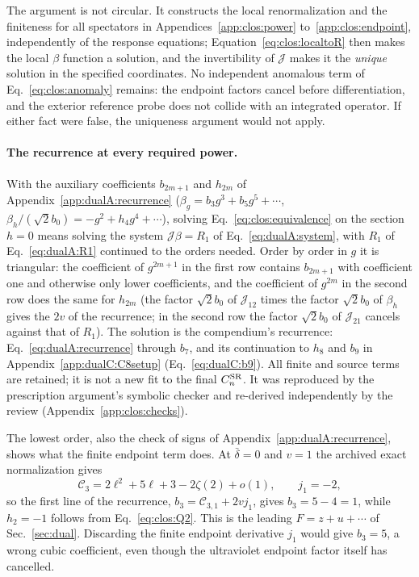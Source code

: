\documentclass[11pt,a4paper]{article}
\numberwithin{equation}{section}
\newcommand{\CSR}{C^{\rm SR}}
\newcommand{\db}{\bar\delta}
\begin{document}
The argument is not circular. It constructs the local renormalization and the finiteness for all spectators in
Appendices~\ref{app:clos:power} to~\ref{app:clos:endpoint}, independently of the response equations;
Equation~\eqref{eq:clos:localtoR} then makes the local $\beta$ function a solution, and the invertibility of
$\mathcal J$ makes it the \emph{unique} solution in the specified coordinates. No
independent anomalous term of Eq.~\eqref{eq:clos:anomaly} remains: the endpoint factors cancel before
differentiation, and the exterior reference probe does not collide with an integrated operator. If either fact were
false, the uniqueness argument would not apply.

\paragraph{The recurrence at every required power.} With the auxiliary coefficients $b_{2m+1}$ and $h_{2m}$ of
Appendix~\ref{app:dualA:recurrence} ($\beta_g=b_3g^3+b_5g^5+\cdots$, $\beta_h/(\sqrt2b_0)=-g^2+h_4g^4+\cdots$),
solving Eq.~\eqref{eq:clos:equivalence} on the section $h=0$ means solving the system $\mathcal J\beta=R_1$ of
Eq.~\eqref{eq:dualA:system}, with $R_1$ of Eq.~\eqref{eq:dualA:R1} continued to the orders needed. Order by order in
$g$ it is triangular: the coefficient of $g^{2m+1}$ in the first
row contains $b_{2m+1}$ with coefficient one and otherwise only lower coefficients, and the coefficient of $g^{2m}$ in
the second row does the same for $h_{2m}$ (the factor $\sqrt2b_0$ of $\mathcal J_{12}$ times the factor $\sqrt2b_0$ of $\beta_h$ gives the $2v$ of the
recurrence; in the second row the factor $\sqrt2b_0$ of $\mathcal J_{21}$ cancels against that of $R_1$). The solution is the compendium's recurrence: Eq.~\eqref{eq:dualA:recurrence} through $b_7$, and its continuation to
$h_8$ and $b_9$ in Appendix~\ref{app:dualC:C8setup} (Eq.~\eqref{eq:dualC:b9}). All finite and source terms are
retained; it is not a new fit to the final $\CSR_n$. It was reproduced by the prescription
argument's symbolic checker and re-derived independently by the review (Appendix~\ref{app:clos:checks}).

The lowest order, also the check of signs of Appendix~\ref{app:dualA:recurrence}, shows what the finite endpoint
term does. At $\db=0$ and $v=1$ the archived exact normalization gives
\begin{equation}
 \mathcal C_3=2\ell^2+5\ell+3-2\zeta(2)+o(1),\qquad j_1=-2,
\end{equation}
so the first line of the recurrence, $b_3=\mathcal C_{3,1}+2vj_1$, gives $b_3=5-4=1$, while $h_2=-1$ follows from
Eq.~\eqref{eq:clos:Q2}. This is the leading $F=z+u+\cdots$ of Sec.~\ref{sec:dual}. Discarding the finite endpoint
derivative $j_1$ would give $b_3=5$, a wrong cubic coefficient, even though the ultraviolet endpoint factor itself has
cancelled.
\end{document}
